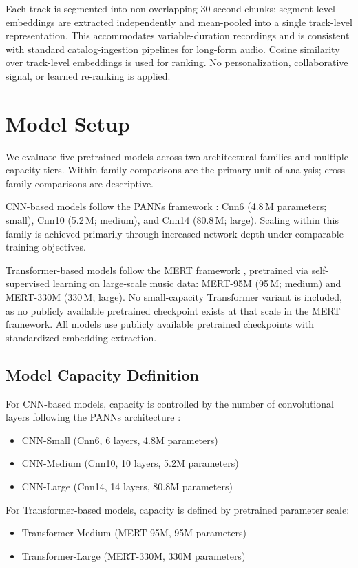 \documentclass{CPP}
\begin{document}
Each track is segmented into non-overlapping 30-second chunks; segment-level embeddings are extracted independently and mean-pooled into a single track-level representation. This accommodates variable-duration recordings and is consistent with standard catalog-ingestion pipelines for long-form audio. Cosine similarity over track-level embeddings is used for ranking. No personalization, collaborative signal, or learned re-ranking is applied.

\section{Model Setup}

We evaluate five pretrained models across two architectural families and multiple capacity tiers. Within-family comparisons are the primary unit of analysis; cross-family comparisons are descriptive.

CNN-based models follow the PANNs framework \cite{kong2020panns}: Cnn6 (4.8\,M parameters; small), Cnn10 (5.2\,M; medium), and Cnn14 (80.8\,M; large). Scaling within this family is achieved primarily through increased network depth under comparable training objectives.

Transformer-based models follow the MERT framework \cite{li2023mert}, pretrained via self-supervised learning on large-scale music data: MERT-95M (95\,M; medium) and MERT-330M (330\,M; large). No small-capacity Transformer variant is included, as no publicly available pretrained checkpoint exists at that scale in the MERT framework. All models use publicly available pretrained checkpoints with standardized embedding extraction.

\subsection{Model Capacity Definition}

For CNN-based models, capacity is controlled by the number of convolutional layers following the PANNs architecture \cite{kong2020panns}:
\begin{itemize}
  \item CNN-Small (Cnn6, 6 layers, 4.8M parameters)
  \item CNN-Medium (Cnn10, 10 layers, 5.2M parameters)
  \item CNN-Large (Cnn14, 14 layers, 80.8M parameters)
\end{itemize}

For Transformer-based models, capacity is defined by pretrained parameter scale:
\begin{itemize}
  \item Transformer-Medium (MERT-95M, 95M parameters)
  \item Transformer-Large (MERT-330M, 330M parameters)
\end{itemize}
\end{document}
